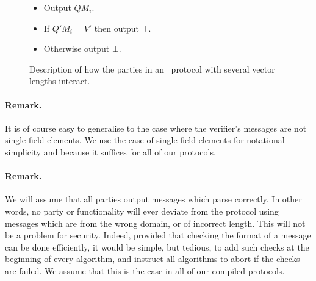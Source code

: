 \begin{figure}[!h]
{\begin{minipage}[t]{6.5cm}
\begin{algorithm}[H]
\begin{itemize}
\end{itemize}
\end{algorithm}
\begin{algorithm}[H]
\caption*{\ILCopen($\sizevect_i,Q$)}
\begin{itemize}
\item Output $QM_i$.
\end{itemize}
\end{algorithm}
\begin{algorithm}[H]
\caption*{\ILCcheck($\sizevect_i,Q', V'$)}
\begin{itemize}
\item If $Q'M_i = V'$ then output $\top$.
\item Otherwise output $\bot$.
\end{itemize}
\end{algorithm}
\end{minipage}
}
\caption{Description of how the parties in an \ILC\ protocol with several vector lengths interact.}
\label{fig:ILCpseudocodemixlen}
\end{figure}

\paragraph{Remark.} It is of course easy to generalise to the case where the verifier's messages are not single field elements. We use the case of single field elements for notational simplicity and because it suffices for all of our protocols.

\paragraph{Remark.} We will assume that all parties output messages which parse correctly. In other words, no party or functionality will ever deviate from the protocol using messages which are from the wrong domain, or of incorrect length. This will not be a problem for security. Indeed, provided that checking the format of a message can be done efficiently, it would be simple, but tedious, to add such checks at the beginning of every algorithm, and instruct all algorithms to abort if the checks are failed. We assume that this is the case in all of our compiled protocols.

